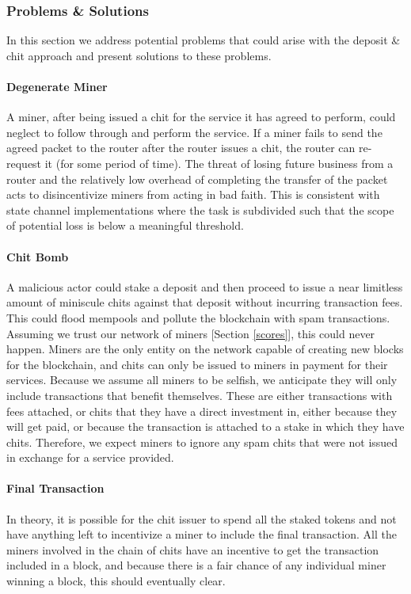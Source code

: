\documentclass[10pt, nonatbib, nocopyrightspace, reprint]{sigplanconf}
\begin{document}
\subsubsection{Problems \& Solutions}

In this section we address potential problems that could arise with the deposit \& chit approach and present solutions to these problems.

\paragraph{Degenerate Miner} A miner, after being issued a chit for the service it has agreed to perform, could neglect to follow through and perform the service. If a miner fails to send the agreed packet to the router after the router issues a chit, the router can re-request it (for some period of time). The threat of losing future business from a router and the relatively low overhead of completing the transfer of the packet acts to disincentivize miners from acting in bad faith. This is consistent with state channel implementations where the task is subdivided such that the scope of potential loss is below a meaningful threshold.

\paragraph{Chit Bomb} A malicious actor could stake a deposit and then proceed to issue a near limitless amount of miniscule chits against that deposit without incurring transaction fees. This could flood mempools and pollute the blockchain with spam transactions. Assuming we trust our network of miners [Section \ref{scores}], this could never happen. Miners are the only entity on the network capable of creating new blocks for the blockchain, and chits can only be issued to miners in payment for their services. Because we assume all miners to be selfish, we anticipate they will only include transactions that benefit themselves. These are either transactions with fees attached, or chits that they have a direct investment in, either because they will get paid, or because the transaction is attached to a stake in which they have chits. Therefore, we expect miners to ignore any spam chits that were not issued in exchange for a service provided.

\paragraph{Final Transaction}
In theory, it is possible for the chit issuer to spend all the staked tokens and not have anything left to incentivize a miner to include the final transaction. All the miners involved in the chain of chits have an incentive to get the transaction included in a block, and because there is a fair chance of any individual miner winning a block, this should eventually clear.
\end{document}
